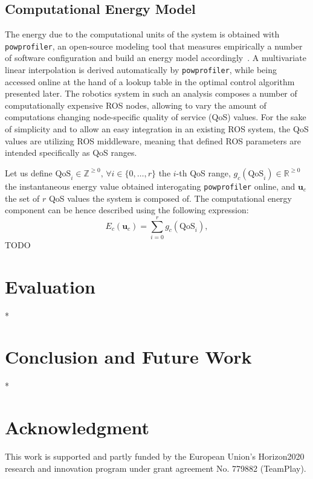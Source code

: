 \documentclass[letterpaper,10pt,conference]{ieeeconf}
\newcommand{\stt}[1]{{\small\tt #1}} %
\newcommand{\powprof}{\stt{powprofiler}}
\begin{document}
\subsection{Computational Energy Model}

The energy due to the computational units of the system is obtained with \powprof{}, an open-source modeling tool that measures empirically a number of software configuration and build an energy model accordingly~\cite{seewald2019coarse}. A multivariate linear interpolation is derived automatically by \powprof{}, while being accessed online at the hand of a lookup table in the optimal control algorithm presented later. The robotics system in such an analysis composes a number of computationally expensive ROS nodes, allowing to vary the amount of computations changing node-specific quality of service (QoS) values. For the sake of simplicity and to allow an easy integration in an existing ROS system, the QoS values are utilizing ROS middleware, meaning that defined ROS parameters are intended specifically as QoS ranges.   

Let us define $\mathrm{QoS}_i\in\mathbb{Z}^{\geq 0},\,\forall i\in\{0,\dots,r\}$ the $i$-th QoS range, $g_c(\mathrm{QoS}_i)\in\mathbb{R}^{\geq 0}$ the instantaneous energy value obtained interogating \powprof{} online, and $\mathbf{u}_c$ the set of $r$ QoS values the system is composed of. The computational energy component can be hence described using the following expression:
\begin{equation}
  E_c(\mathbf{u}_c)=\sum_{i=0}^{r}{g_c(\mathrm{QoS}_i)},
\end{equation}
TODO



\section{Evaluation}
\label{sec:experimental}

*

\section{Conclusion and Future Work}
\label{sec:conclusion}

*

\section*{Acknowledgment}

This work is supported and partly funded by the European Union's Horizon2020 research and innovation program under grant agreement No. 779882 (TeamPlay).


 
\vspace{0.1ex}
\end{document}
